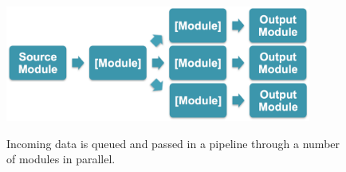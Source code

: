 {
\renewcommand{\baselinestretch}{1.0}
\begin{figure}[t]
\begin{center}

   \includegraphics[height=1.5in]{fig_pds.eps}

\end{center}
{Incoming data is queued and passed in a pipeline through a number of modules in parallel.}

\label{fig:pds}
\end{figure}
}

